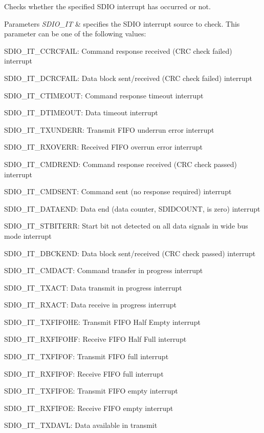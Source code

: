 Checks whether the specified S\+D\+IO interrupt has occurred or not. 


\begin{DoxyParams}{Parameters}
{\em S\+D\+I\+O\+\_\+\+IT} & specifies the S\+D\+IO interrupt source to check. This parameter can be one of the following values\+: \begin{DoxyItemize}
\item S\+D\+I\+O\+\_\+\+I\+T\+\_\+\+C\+C\+R\+C\+F\+A\+IL\+: Command response received (C\+RC check failed) interrupt \item S\+D\+I\+O\+\_\+\+I\+T\+\_\+\+D\+C\+R\+C\+F\+A\+IL\+: Data block sent/received (C\+RC check failed) interrupt \item S\+D\+I\+O\+\_\+\+I\+T\+\_\+\+C\+T\+I\+M\+E\+O\+UT\+: Command response timeout interrupt \item S\+D\+I\+O\+\_\+\+I\+T\+\_\+\+D\+T\+I\+M\+E\+O\+UT\+: Data timeout interrupt \item S\+D\+I\+O\+\_\+\+I\+T\+\_\+\+T\+X\+U\+N\+D\+E\+RR\+: Transmit F\+I\+FO underrun error interrupt \item S\+D\+I\+O\+\_\+\+I\+T\+\_\+\+R\+X\+O\+V\+E\+RR\+: Received F\+I\+FO overrun error interrupt \item S\+D\+I\+O\+\_\+\+I\+T\+\_\+\+C\+M\+D\+R\+E\+ND\+: Command response received (C\+RC check passed) interrupt \item S\+D\+I\+O\+\_\+\+I\+T\+\_\+\+C\+M\+D\+S\+E\+NT\+: Command sent (no response required) interrupt \item S\+D\+I\+O\+\_\+\+I\+T\+\_\+\+D\+A\+T\+A\+E\+ND\+: Data end (data counter, S\+D\+I\+D\+C\+O\+U\+NT, is zero) interrupt \item S\+D\+I\+O\+\_\+\+I\+T\+\_\+\+S\+T\+B\+I\+T\+E\+RR\+: Start bit not detected on all data signals in wide bus mode interrupt \item S\+D\+I\+O\+\_\+\+I\+T\+\_\+\+D\+B\+C\+K\+E\+ND\+: Data block sent/received (C\+RC check passed) interrupt \item S\+D\+I\+O\+\_\+\+I\+T\+\_\+\+C\+M\+D\+A\+CT\+: Command transfer in progress interrupt \item S\+D\+I\+O\+\_\+\+I\+T\+\_\+\+T\+X\+A\+CT\+: Data transmit in progress interrupt \item S\+D\+I\+O\+\_\+\+I\+T\+\_\+\+R\+X\+A\+CT\+: Data receive in progress interrupt \item S\+D\+I\+O\+\_\+\+I\+T\+\_\+\+T\+X\+F\+I\+F\+O\+HE\+: Transmit F\+I\+FO Half Empty interrupt \item S\+D\+I\+O\+\_\+\+I\+T\+\_\+\+R\+X\+F\+I\+F\+O\+HF\+: Receive F\+I\+FO Half Full interrupt \item S\+D\+I\+O\+\_\+\+I\+T\+\_\+\+T\+X\+F\+I\+F\+OF\+: Transmit F\+I\+FO full interrupt \item S\+D\+I\+O\+\_\+\+I\+T\+\_\+\+R\+X\+F\+I\+F\+OF\+: Receive F\+I\+FO full interrupt \item S\+D\+I\+O\+\_\+\+I\+T\+\_\+\+T\+X\+F\+I\+F\+OE\+: Transmit F\+I\+FO empty interrupt \item S\+D\+I\+O\+\_\+\+I\+T\+\_\+\+R\+X\+F\+I\+F\+OE\+: Receive F\+I\+FO empty interrupt \item S\+D\+I\+O\+\_\+\+I\+T\+\_\+\+T\+X\+D\+A\+VL\+: Data available in transmit 
\end{DoxyItemize}
\end{DoxyParams}
